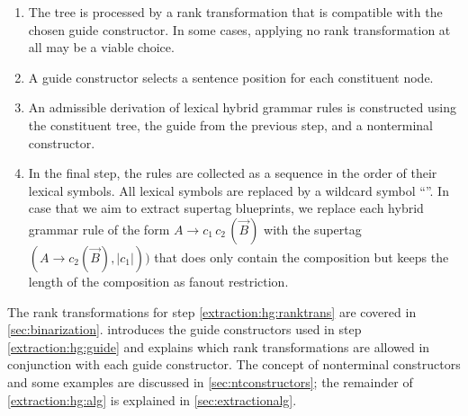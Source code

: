 \documentclass[../../document.tex]{subfiles}
\begin{document}
    \begin{enumerate}
        \item\label{extraction:hg:ranktrans}
            The tree is processed by a rank transformation that is compatible with the chosen guide constructor.
            In some cases, applying no rank transformation at all may be a viable choice.
        \item\label{extraction:hg:guide}
            A guide constructor selects a sentence position for each constituent node.
        \item\label{extraction:hg:alg}
            An admissible derivation of lexical hybrid grammar rules is constructed using the constituent tree, the guide from the previous step, and a nonterminal constructor.
        \item
            In the final step, the rules are collected as a sequence in the order of their lexical symbols.
            All lexical symbols are replaced by a wildcard symbol ``\tn{*}''.
            In case that we aim to extract  supertag blueprints, we replace each hybrid grammar rule of the form \(A \to c_1\,c_2\,(\vec{B})\) with the  supertag \((A \to c_2 (\vec{B}), |c_1|))\) that does only contain the  composition but keeps the length of the  composition as fanout restriction.
    \end{enumerate}
    The rank transformations for step \ref{extraction:hg:ranktrans} are covered in \cref{sec:binarization}.
     introduces the guide constructors used in step \ref{extraction:hg:guide} and explains which rank transformations are allowed in conjunction with each guide constructor.
    The concept of nonterminal constructors and some examples are discussed in \cref{sec:ntconstructors}; the remainder of \cref{extraction:hg:alg} is explained in \cref{sec:extractionalg}.
    

    
    
    

    \ifSubfilesClassLoaded{%
        \printindex
    }{}
\end{document}
